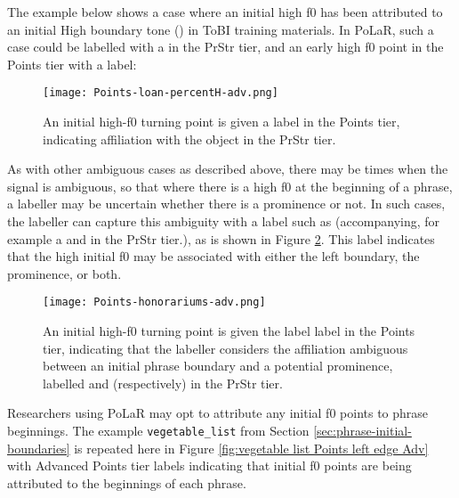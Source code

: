 The example below shows a case where an initial high f0 has been attributed to an initial High boundary tone () in ToBI training materials. In PoLaR, such a case could be labelled with a \textlabel{[} in the PrStr tier, and an early high f0 point in the Points tier with a \textlabel{[<} label:

\begin{figure}[H]
\centering
%
\texttt{[image: Points-loan-percentH-adv.png]}
%
\caption[An initial high-f0 turning point is given a \textlabel{[<} label in the Points tier.]{An initial high-f0 turning point is given a \textlabel{[<} label in the Points tier, indicating affiliation with the \textlabel{[} object in the PrStr tier.%
\label{fig:loan-percentH Points Adv}%
}
\end{figure}

As with other ambiguous cases as described above, there may be times when the signal is ambiguous, so that where there is a high f0 at the beginning of a phrase, a labeller may be uncertain whether there is a prominence or not. In such cases, the labeller can capture this ambiguity with a label such as \textlabel{[</*<} (accompanying, for example  a \textlabel{[} and  in the PrStr tier.), as is shown in Figure \ref{fig:honorariums Points Adv}.  This label indicates that the high initial f0 may be associated with either the left boundary, the prominence, or both.

\begin{figure}[H]
\centering
%
\texttt{[image: Points-honorariums-adv.png]}
%
\caption[An initial high-f0 turning point is given the label \textlabel{[</*<} label in the Points tier.]{An initial high-f0 turning point is given the label \textlabel{[</*<} label in the Points tier, indicating that the labeller considers the affiliation ambiguous between an initial phrase boundary and a potential prominence, labelled \textlabel{[} and  (respectively) in the PrStr tier.%
\label{fig:honorariums Points Adv}%
}
\end{figure}

Researchers using PoLaR may opt to attribute any initial f0 points to phrase beginnings. The example \texttt{vegetable\_list} from Section \ref{sec:phrase-initial-boundaries} is repeated here in Figure \ref{fig:vegetable list Points left edge Adv} with Advanced Points tier labels indicating that initial f0 points are being attributed to the beginnings of each phrase.

